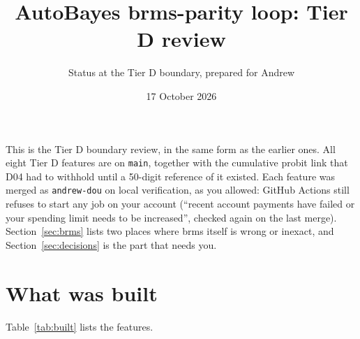\documentclass[11pt]{article}
\title{AutoBayes brms-parity loop: Tier D review}
\author{Status at the Tier D boundary, prepared for Andrew}
\date{17 October 2026}
\newcommand{\code}[1]{\texttt{#1}}
\begin{document}
\maketitle

\noindent This is the Tier D boundary review, in the same form as the earlier ones. All eight Tier D features are on
\code{main}, together with the cumulative probit link that D04 had to withhold until a 50-digit reference of it existed.
Each feature was merged as \code{andrew-dou} on local verification, as you allowed: GitHub Actions still refuses to start
any job on your account (``recent account payments have failed or your spending limit needs to be increased'', checked
again on the last merge). Section~\ref{sec:brms} lists two places where brms itself is wrong or inexact, and
Section~\ref{sec:decisions} is the part that needs you.

\section{What was built}
\label{sec:built}

Table~\ref{tab:built} lists the features.
\end{document}
